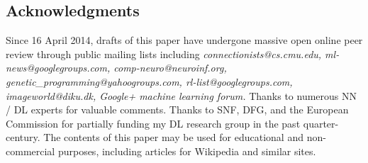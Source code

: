 \documentclass[letterpaper]{article}
\begin{document}
\begin{CJK*}{UTF8}{gbsn}


\section{Acknowledgments}
\label{ack}


Since 16 April 2014, drafts of this paper have undergone massive open online peer review through public mailing lists including 
{\em connectionists\-@cs.cmu.edu, ml-news\-@googlegroups.com, comp-neuro\-@neuro\-inf.org, genetic\_pro\-gramming\-@yahoo\-groups.com, rl-list\-@googlegroups.com, image\-world\-@diku.dk, Google+ machine learning forum.} 
Thanks to numerous NN / DL experts for valuable comments. Thanks to SNF, DFG, and the European Commission for partially funding my DL research group in the past quarter-century.
The contents of this paper may be used for educational and non-commercial purposes, including articles for Wikipedia and similar sites.




%
%
%
%
%
\end{CJK*}
\end{document}
